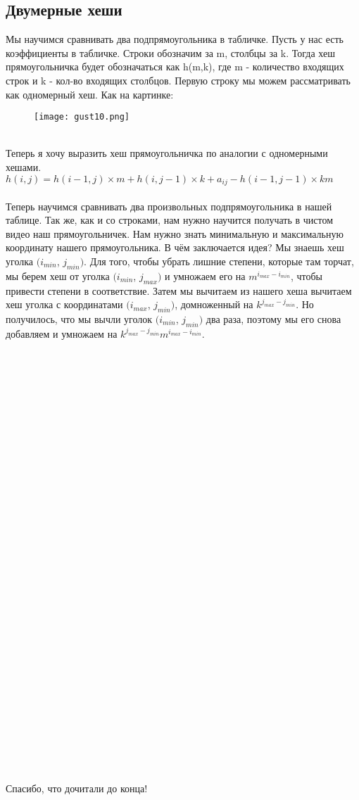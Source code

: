 \documentclass[a4paper,12pt]{article}
\begin{document}
\subsection{Двумерные хеши}
Мы научимся сравнивать два подпрямоугольника в табличке. Пусть у нас есть коэффициенты в табличке. Строки обозначим за m, столбцы за k. Тогда хеш прямоугольничка будет обозначаться как h(m,k), где m - количество входящих строк и k - кол-во входящих столбцов. Первую строку мы можем рассматривать как одномерный хеш. Как на картинке:
\begin{figure}[h]
\centering
\texttt{[image: gust10.png]}
\end{figure}
\\
Теперь я хочу выразить хеш прямоугольничка по аналогии с одномерными хешами.\\
$h(i, j) = h(i - 1, j)\times m + h(i, j - 1)\times k + a_{ij} - h(i - 1, j - 1)\times km$
\\
\\
Теперь научимся сравнивать два произвольных подпрямоугольника в нашей таблице. Так же, как и со строками, нам нужно научится получать в чистом видео наш прямоугольничек. Нам нужно знать минимальную и максимальную координату нашего прямоугольника. В чём заключается идея? Мы знаешь хеш уголка $(i_{min}$, $j_{min})$. Для того, чтобы убрать лишние степени, которые там торчат, мы берем хеш от уголка $(i_{min}$, $j_{max})$ и умножаем его на $m^{i_{max} - i_{min}}$, чтобы привести степени в соответствие. Затем мы вычитаем из нашего хеша вычитаем хеш уголка с координатами $(i_{max}$, $j_{min})$, домноженный на $k^{{j_{max} - j_{min}}}$. Но получилось, что мы вычли уголок $(i_{min}$, $j_{min})$ два раза, поэтому мы его снова добавляем и умножаем на $k^{{j_{max} - j_{min}}}m^{i_{max} - i_{min}}$. 
\\ \\ \\ \\ \\ \\ \\ \\ \\ \\ \\ \\ \\ \\ \\ \\ \\ \\ \\ \\ \\ \\ \\ \\ \\ \\ \\ \\ \\ \\ \\ \\ \\Спасибо, что дочитали до конца!
\end{document}
